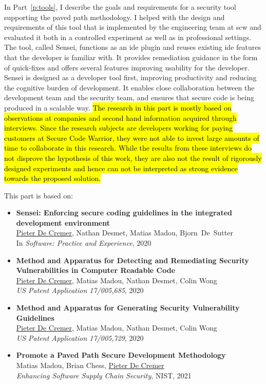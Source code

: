 In Part~\ref{p:tools}, I describe the goals and requirements for a security tool supporting the paved path methodology.
I helped with the design and requirements of this tool that is implemented by the engineering team at \gls{scw} and evaluated it both in a controlled experiment as well as in professional settings.
The tool, called Sensei, functions as an \gls{ide} plugin and reuses existing \gls{ide} features that the developer is familiar with.
It provides remediation guidance in the form of quick-fixes and offers several features improving usability for the developer.
Sensei is designed as a developer tool first, improving productivity and reducing the cognitive burden of development.
It enables close collaboration between the development team and the security team, and ensures that secure code is being produced in a scalable way.
\hl{The research in this part is mostly based on observations at companies and second hand information acquired through interviews.
Since the research subjects are developers working for paying customers at Secure Code Warrior, they were not able to invest large amounts of time to collaborate in this research.
While the results from these interviews do not disprove the hypothesis of this work, they are also not the result of rigorously designed experiments and hence can not be interpreted as strong evidence towards the proposed solution.}

This part is based on:

\begin{itemize}
 \item 
 \textbf{Sensei: Enforcing secure coding guidelines in the integrated development environment}\\
 {\small \underline{Pieter De Cremer}, Nathan Desmet, Matias Madou, \mbox{Bjorn De Sutter}\\}
 In \emph{Software: Practice and Experience}, 2020
    
 \item 
 \textbf{Method and Apparatus for Detecting and Remediating Security Vulnerabilities in Computer Readable Code}\\
 \underline{Pieter De Cremer}, Matias Madou, Nathan Desmet, Colin Wong\\
 \emph{US Patent Application 17/005,685}, 2020
 
 \item 
 \textbf{Method and Apparatus for Generating Security Vulnerability Guidelines}\\
 \underline{Pieter De Cremer}, Matias Madou, Nathan Desmet, Colin Wong\\
 \emph{US Patent Application 17/005,729}, 2020
 
 \item 
 \textbf{Promote a Paved Path Secure Development Methodology}\\
 Matias Madou, Brian Chess, \underline{Pieter De Cremer}\\
 \emph{Enhancing Software Supply Chain Security}, NIST, 2021
\end{itemize}

